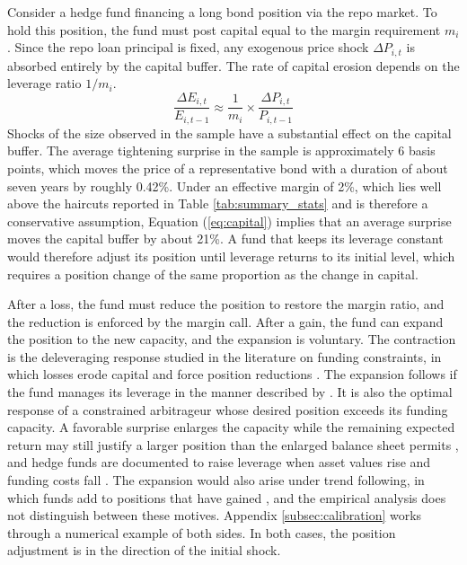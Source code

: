 \documentclass[english, 11pt, oneside]{article}
\begin{document}
Consider a hedge fund financing a long bond position via the repo market. To hold this position, the fund must post capital equal to the margin requirement $m_i$. Since the repo loan principal is fixed, any exogenous price shock $\Delta P_{i,t}$ is absorbed entirely by the capital buffer. The rate of capital erosion depends on the leverage ratio $1/m_i$.
\begin{equation}
\frac{\Delta E_{i,t}}{E_{i,t-1}} \approx \frac{1}{m_i} \times \frac{\Delta P_{i,t}}{P_{i,t-1}}
\label{eq:capital}
\end{equation}
Shocks of the size observed in the sample have a substantial effect on the capital buffer. The average tightening surprise in the sample is approximately 6 basis points, which moves the price of a representative bond with a duration of about seven years by roughly 0.42\%. Under an effective margin of 2\%, which lies well above the haircuts reported in Table \ref{tab:summary_stats} and is therefore a conservative assumption, Equation (\ref{eq:capital}) implies that an average surprise moves the capital buffer by about 21\%. A fund that keeps its leverage constant would therefore adjust its position until leverage returns to its initial level, which requires a position change of the same proportion as the change in capital.

After a loss, the fund must reduce the position to restore the margin ratio, and the reduction is enforced by the margin call. After a gain, the fund can expand the position to the new capacity, and the expansion is voluntary. The contraction is the deleveraging response studied in the literature on funding constraints, in which losses erode capital and force position reductions \citep{brunnermeier2009, geanakoplos2010}. The expansion follows if the fund manages its leverage in the manner described by \citet{adrian2014}. It is also the optimal response of a constrained arbitrageur whose desired position exceeds its funding capacity. A favorable surprise enlarges the capacity while the remaining expected return may still justify a larger position than the enlarged balance sheet permits \citep{gromb2002}, and hedge funds are documented to raise leverage when asset values rise and funding costs fall \citep{ang2011}. The expansion would also arise under trend following, in which funds add to positions that have gained \citep{moskowitz2012, deLong1990}, and the empirical analysis does not distinguish between these motives. Appendix \ref{subsec:calibration} works through a numerical example of both sides. In both cases, the position adjustment is in the direction of the initial shock.
\end{document}
